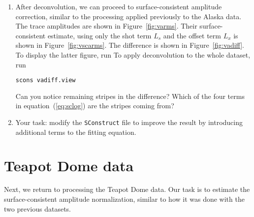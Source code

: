 \begin{enumerate}
\item After deconvolution, we can proceed to surface-consistent amplitude correction, similar to the processing applied previously to the Alaska data. The trace amplitudes are shown in Figure~\ref{fig:varms}. Their surface-consistent estimate, using only the shot term $L_s$ and the offset term $L_x$ is shown in Figure~\ref{fig:vscarms}. The difference is shown in Figure~\ref{fig:vadiff}. To display the latter figure, run
To apply deconvolution to the whole dataset, run
\begin{verbatim}
scons vadiff.view
\end{verbatim}
Can you notice remaining stripes in the difference? Which of the four terms in equation~(\ref{eq:sclog}) are the stripes coming from?

\answer{
}


\item Your task: modify the \texttt{SConstruct} file to improve the result
by introducing additional terms to the fitting equation.

\end{enumerate}

\lstset{language=python,numbers=left,numberstyle=\tiny,showstringspaces=false}


\section{Teapot Dome data}

Next, we return to processing the Teapot Dome data. Our task is to
estimate the surface-consistent amplitude normalization, similar to
how it was done with the two previous datasets.

